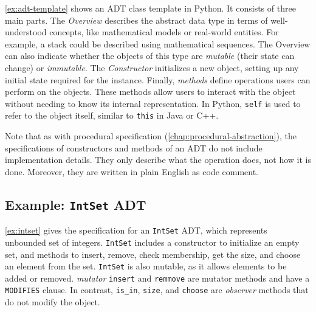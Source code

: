 \documentclass[oneside,11pt,dvipsnames]{book}
\newcommand{\code}[1]{\texttt{#1}}
\begin{document}
\autoref{ex:adt-template} shows an ADT class template in Python. It consists of three main parts. The \emph{Overview} describes the abstract data type in terms of well-understood concepts, like mathematical models or real-world entities. For example, a stack could be described using mathematical sequences.
The Overview can also indicate whether the objects of this type are \emph{mutable} (their state can change) or \emph{immutable}.
The \emph{Constructor} initializes a new object, setting up any initial state required for the instance.
Finally, \emph{methods} define operations users can perform on the objects. These methods allow users to interact with the object without needing to know its internal representation. In Python, \code{self} is used to refer to the object itself, similar to \code{this} in Java or C++.

Note that as with procedural specification (\autoref{chap:procedural-abstraction}), the specifications of constructors and methods of an ADT do not include implementation details. They only describe what the operation does, not how it is done. Moreover, they are written in plain English as code comment.


\subsection{Example: \code{IntSet} ADT}

\autoref{ex:intset} gives the specification for an \code{IntSet} ADT, which represents unbounded set of integers. \code{IntSet} includes a constructor to initialize an empty set, and methods to insert, remove, check membership, get the size, and choose an element from the set. \code{IntSet} is also mutable, as it allows elements to be added or removed. \emph{mutator} \code{insert} and \code{remmove} are mutator methods and have a \code{MODIFIES} clause.  In contrast, \code{is\_in}, \code{size}, and \code{choose} are \emph{observer} methods that do not modify the object.
\end{document}
